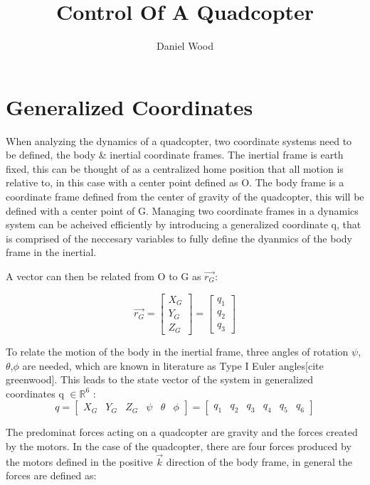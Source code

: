\documentclass[10pt, letterpaper]{article}
\newcommand{\R}{\mathbb{R}}
\begin{document}
\title{Control Of A Quadcopter}
\author{Daniel Wood}
\maketitle

\section{Generalized Coordinates}

When analyzing the dynamics of a quadcopter, two coordinate systems need to be defined, the body \& inertial coordinate frames. The inertial frame is earth fixed, this can be thought of as a centralized home position that all motion is relative to, in this case with a center point defined as O. The body frame is a coordinate frame defined from the center of gravity of the quadcopter, this will be defined with a center point of G. Managing two coordinate frames in a dynamics system can be acheived efficiently by introducing a generalized coordinate q, that is comprised of the neccesary variables to fully define the dyanmics of the body frame in the inertial.

A vector can then be related from O to G as $\overrightarrow{r_{G}}$:

\[
\overrightarrow{r_{G}} = \left[\begin{array}{c}
X_{G}\\
Y_{G}\\
Z_{G}
\end{array}\right]
= \left[\begin{array}{c}
q_{1}\\
q_{2}\\
q_{3}
\end{array}\right]
\]

To relate the motion of the body in the inertial frame, three angles of rotation $\psi$,$\theta$,$\phi$ are needed, which are known in literature as Type I Euler angles[cite greenwood]. This leads to the state vector of the system in generalized coordinates q $\in \R^{6}$ :
\[
q=[\begin{array}{cccccc}
X_{G} & Y_{G} & Z_{G} & \psi & \theta & \phi\end{array}]
= [\begin{array}{cccccc}
q_{1} & q_{2} & q_{3} & q_{4} & q_{5} & q_{6}\end{array}]
\]

The predominat forces acting on a quadcopter are gravity and the forces created by the motors.
In the case of the quadcopter, there are four forces produced by the motors defined in the positive $\overrightarrow{k}$ direction of the body frame, in general the forces are defined as:
\end{document}
